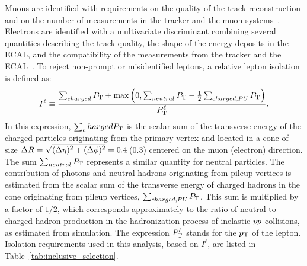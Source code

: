 Muons are identified with requirements on the quality of
the track reconstruction and on the number of measurements in the
tracker and the muon systems~\cite{Chatrchyan:2012xi}.
Electrons are identified with a multivariate discriminant
combining several quantities describing the track quality,
the shape of the energy deposits in the ECAL,
and the compatibility of the measurements from the tracker and the
ECAL~\cite{Khachatryan:2015hwa}.
To reject non-prompt or misidentified leptons, a relative lepton isolation is defined as:
\begin{equation}
I^{\ell} \equiv \frac{\sum_{charged}  P_\mathrm{T} + \max\left( 0, \sum_{neutral}  P_\mathrm{T}
                                         - \frac{1}{2} \sum_{charged, PU} P_\mathrm{T}  \right )}{P_\mathrm{T}^{\ell}}.
\label{eq:reconstruction_isolation}
\end{equation}
In this expression, $\sum_charged  P_\mathrm{T}$ is the scalar sum of the
transverse energy of the charged particles originating from
the primary vertex and located in a cone of size
$\Delta R = \sqrt{\smash[b]{(\Delta \eta)^2 + (\Delta \phi)^2}} = 0.4$\,(0.3)
centered on the muon (electron) direction. The sum
$\sum_{neutral}  P_\mathrm{T}$  represents
a similar quantity for neutral particles.
The contribution of photons and neutral hadrons originating from pileup vertices is estimated from the scalar sum of the transverse
energy of charged hadrons in the cone originating from pileup vertices,
$\sum_{charged, PU} P_\mathrm{T}$. This sum is multiplied by a factor of
$1/2$, which corresponds approximately to the ratio of neutral to charged
hadron production in the hadronization process
of inelastic $pp$ collisions, as estimated from simulation.
The expression $P_\mathrm{T}^{\ell}$ stands for the $p_\mathrm{T}$ of the lepton. Isolation requirements used in this analysis, based on $I^{\ell}$, are listed in Table~\ref{tab:inclusive_selection}.

